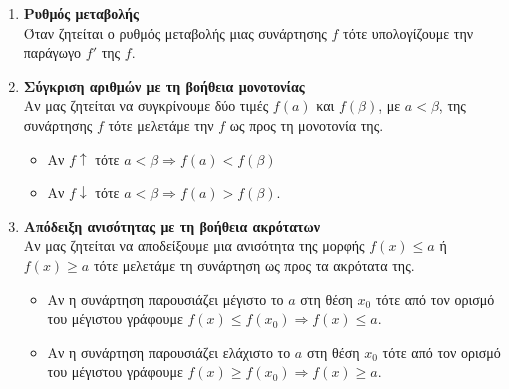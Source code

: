 \documentclass[a4paper,11pt]{article}
\begin{document}
\begin{enumerate}[label=\bf\thesection.\arabic*.]
\begin{itemize}
\begin{center}
\end{center}
\end{itemize}
\item\textbf{Ρυθμός μεταβολής}\\
Όταν ζητείται ο ρυθμός μεταβολής μιας συνάρτησης $f$ τότε υπολογίζουμε την παράγωγο $f'$ της $f$.
\item\textbf{Σύγκριση αριθμών με τη βοήθεια μονοτονίας}\\
Αν μας ζητείται να συγκρίνουμε δύο τιμές $f(a)$ και $f(\beta)$, με $a<\beta$, της συνάρτησης $f$ τότε μελετάμε την $f$ ως προς τη μονοτονία της. 
\begin{itemize}
\item Αν $f\uparrow$ τότε $a<\beta\Rightarrow f(a)<f(\beta)$
\item Αν $f\downarrow$ τότε $a<\beta\Rightarrow f(a)>f(\beta)$.
\end{itemize}
\item\textbf{Απόδειξη ανισότητας με τη βοήθεια ακρότατων}\\
Αν μας ζητείται να αποδείξουμε μια ανισότητα της μορφής $f(x)\leq a$ ή $f(x)\geq a$ τότε μελετάμε τη συνάρτηση ως προς τα ακρότατα της.
\begin{itemize}
\item Αν η συνάρτηση παρουσιάζει μέγιστο το $a$ στη θέση $x_0$ τότε από τον ορισμό του μέγιστου γράφουμε $f(x)\leq f(x_0)\Rightarrow f(x)\leq a$.
\item Αν η συνάρτηση παρουσιάζει ελάχιστο το $a$ στη θέση $x_0$ τότε από τον ορισμό του μέγιστου γράφουμε $f(x)\geq f(x_0)\Rightarrow f(x)\geq a$.
\end{itemize}
\end{enumerate}
\end{document}
